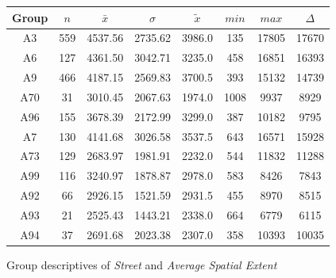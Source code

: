 \begin{figure}[ht!]
	\centering
	\begin{minipage}{0.5\textwidth}
		\tiny
		\setlength{\tabcolsep}{4pt}
		\centering
		\begin{tabular}{c|c|c|c|c|c|c|c}
			\toprule
			Group & $n$ & $\bar{x}$ & $\sigma$ & $\tilde{x}$ & $min$ & $max$ & $\Delta$ \\
			\midrule
			A3  & 559 & 4537.56 & 2735.62 & 3986.0 & 135  & 17805 & 17670 \\ 
			A6  & 127 & 4361.50 & 3042.71 & 3235.0 & 458  & 16851 & 16393 \\ 
			A9  & 466 & 4187.15 & 2569.83 & 3700.5 & 393  & 15132 & 14739 \\ 
			A70 & 31  & 3010.45 & 2067.63 & 1974.0 & 1008 & 9937  & 8929 \\ 
			A96 & 155 & 3678.39 & 2172.99 & 3299.0 & 387  & 10182 & 9795 \\ 
			A7  & 130 & 4141.68 & 3026.58 & 3537.5 & 643  & 16571 & 15928 \\ 
			A73 & 129 & 2683.97 & 1981.91 & 2232.0 & 544  & 11832 & 11288 \\ 
			A99 & 116 & 3240.97 & 1878.87 & 2978.0 & 583  & 8426  & 7843 \\ 
			A92 & 66  & 2926.15 & 1521.59 & 2931.5 & 455  & 8970  & 8515 \\ 
			A93 & 21  & 2525.43 & 1443.21 & 2338.0 & 664  & 6779  & 6115 \\ 
			A94 & 37  & 2691.68 & 2023.38 & 2307.0 & 358  & 10393 & 10035 \\ 
			\bottomrule
		\end{tabular}
		\label{tbl:descriptives_baysis_matched_Str_SAvg}
	\end{minipage}%
	\begin{minipage}{0.55\textwidth}
		\tiny
		\centering
		\vfill
		\label{fig:descriptives_baysis_matched_Str_SAvg}
	\end{minipage}%
	\caption{Group descriptives of \textit{Street} and \textit{Average Spatial Extent}}
\end{figure}

